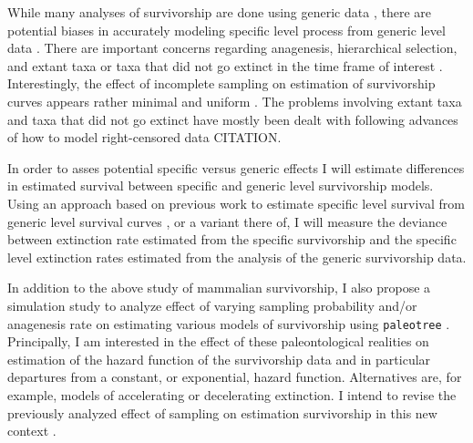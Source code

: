 \documentclass[12pt,letterpaper]{article}
\begin{document}


While many analyses of survivorship are done using generic data \citep{Tomiya2013,Liow2008,Harnik2013}, there are potential biases in accurately modeling specific level process from generic level data \citep{Raup1975,Sepkoski1975,Simpson2006,Raup1991a,VanValen1979}. There are important concerns regarding anagenesis, hierarchical selection, and extant taxa or taxa that did not go extinct in the time frame of interest \citep{Raup1975,VanValen1979,Simpson2006,Raup1991a}. Interestingly, the effect of incomplete sampling on estimation of survivorship curves appears rather minimal and uniform \citep{Sepkoski1975}. The problems involving extant taxa and taxa that did not go extinct have mostly been dealt with following advances of how to model right-censored data CITATION. 

In order to asses potential specific versus generic effects I will estimate differences in estimated survival between specific and generic level survivorship models. Using an approach based on previous work to estimate specific level survival from generic level survival curves \citep{Foote1988}, or a variant there of, I will measure the deviance between extinction rate estimated from the specific survivorship and the specific level extinction rates estimated from the analysis of the generic survivorship data. 

In addition to the above study of mammalian survivorship, I also propose a simulation study to analyze effect of varying sampling probability and/or anagenesis rate on estimating various models of survivorship using \texttt{paleotree} \citep{Bapst2012a}. Principally, I am interested in the effect of these paleontological realities on estimation of the hazard function of the survivorship data and in particular departures from a constant, or exponential, hazard function. Alternatives are, for example, models of accelerating or decelerating extinction. I intend to revise the previously analyzed effect of sampling on estimation survivorship in this new context \citep{Sepkoski1975}.
\end{document}
